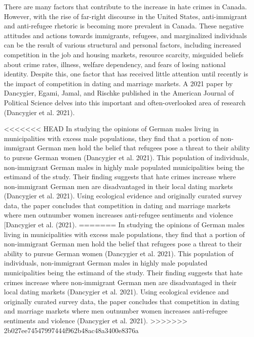 \documentclass[
]{article}
\begin{document}
There are many factors that contribute to the increase in hate crimes in
Canada. However, with the rise of far-right discourse in the United
States, anti-immigrant and anti-refugee rhetoric is becoming more
prevalent in Canada. These negative attitudes and actions towards
immigrants, refugees, and marginalized individuals can be the result of
various structural and personal factors, including increased competition
in the job and housing markets, resource scarcity, misguided beliefs
about crime rates, illness, welfare dependency, and fears of losing
national identity. Despite this, one factor that has received little
attention until recently is the impact of competition in dating and
marriage markets. A 2021 paper by Dancygier, Egami, Jamal, and Rischke
published in the American Journal of Political Science delves into this
important and often-overlooked area of research (Dancygier et al. 2021).

\textless\textless\textless\textless\textless\textless\textless{} HEAD
In studying the opinions of German males living in municipalities with
excess male populations, they find that a portion of non-immigrant
German men hold the belief that refugees pose a threat to their ability
to pursue German women (Dancygier et al. 2021). This population of
individuals, non-immigrant German males in highly male populated
municipalities being the estimand of the study. Their finding suggests
that hate crimes increase where non-immigrant German men are
disadvantaged in their local dating markets (Dancygier et al. 2021).
Using ecological evidence and originally curated survey data, the paper
concludes that competition in dating and marriage markets where men
outnumber women increases anti-refugee sentiments and violence
{[}Dancygier et al. (2021). ======= In studying the opinions of German
males living in municipalities with excess male populations, they find
that a portion of non-immigrant German men hold the belief that refugees
pose a threat to their ability to pursue German women (Dancygier et al.
2021). This population of individuals, non-immigrant German males in
highly male populated municipalities being the estimand of the study.
Their finding suggests that hate crimes increase where non-immigrant
German men are disadvantaged in their local dating markets (Dancygier et
al. 2021). Using ecological evidence and originally curated survey data,
the paper concludes that competition in dating and marriage markets
where men outnumber women increases anti-refugee sentiments and violence
(Dancygier et al. 2021).
\textgreater\textgreater\textgreater\textgreater\textgreater\textgreater\textgreater{}
2b027ee74547997444f962b48ac48a3400e8376a
\end{document}
